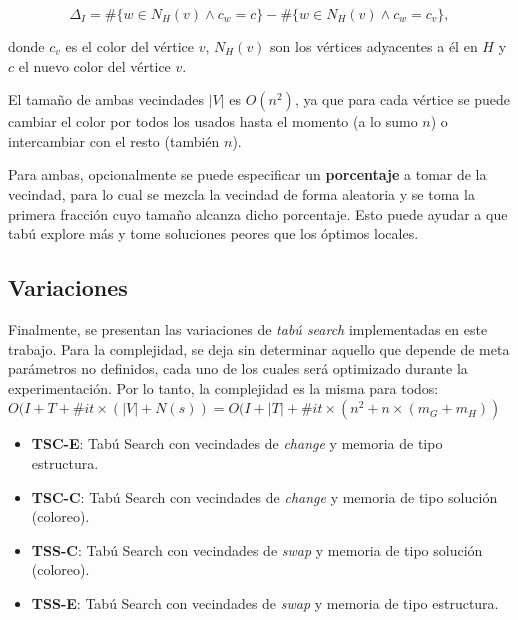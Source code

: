 $$\Delta_I = \#\{w \in N_H(v) \wedge c_w = c\} - \#\{w \in N_H(v) \wedge c_w = c_v\},$$

donde $c_v$ es el color del vértice $v$, $N_H(v)$ son los vértices adyacentes a él en $H$ y $c$ el nuevo color del vértice $v$.

El tamaño de ambas vecindades $|V|$ es $O(n^2)$, ya que para cada vértice se puede cambiar el color por todos los usados hasta el momento (a lo sumo $n$) o intercambiar con el resto (también $n$).

Para ambas, opcionalmente se puede especificar un \textbf{porcentaje} a tomar de la vecindad, para lo cual se mezcla la vecindad de forma aleatoria y se toma la primera fracción cuyo tamaño alcanza dicho porcentaje. Esto puede ayudar a que tabú explore más y tome soluciones peores que los óptimos locales.

\subsection{Variaciones}\label{ts-variaciones}

Finalmente, se presentan las variaciones de \textit{tabú search} implementadas en este trabajo. Para la complejidad, se deja sin determinar aquello que depende de meta parámetros no definidos, cada uno de los cuales será optimizado durante la experimentación. Por lo tanto, la complejidad es la misma para todos: $O(I + T + \#it \times (|V| + N(s)) = O(I + |T| + \#it \times (n^2 + n \times (m_G + m_H))$

\begin{itemize}
    \item \textbf{TSC-E}: Tabú Search con vecindades de \textit{change} y memoria de tipo estructura.
    \item \textbf{TSC-C}: Tabú Search con vecindades de \textit{change} y memoria de tipo solución (coloreo).
    \item \textbf{TSS-C}: Tabú Search con vecindades de \textit{swap} y memoria de tipo solución (coloreo).
    \item \textbf{TSS-E}: Tabú Search con vecindades de \textit{swap} y memoria de tipo estructura.
\end{itemize}

